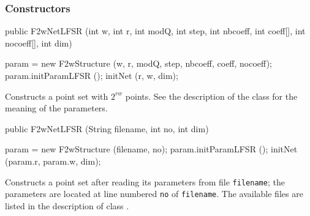 \subsubsection*{Constructors}
\begin{code}

   public F2wNetLFSR (int w, int r, int modQ, int step, int nbcoeff,
                      int coeff[], int nocoeff[], int dim) \begin{hide} 
   {
      param = new F2wStructure (w, r, modQ, step, nbcoeff, coeff, nocoeff);
      param.initParamLFSR ();
      initNet (r, w, dim);
   }
\end{hide}
\end{code}
 \begin{tabb}
 Constructs a point set with $2^{rw}$ points.  See the description of the class
for the meaning of the parameters.
 \end{tabb}
\begin{code}

   public F2wNetLFSR (String filename, int no, int dim) \begin{hide} 
   {
      param = new F2wStructure (filename, no);
      param.initParamLFSR ();
      initNet (param.r, param.w, dim);
   }\end{hide}
\end{code}
 \begin{tabb}
 Constructs a point set after reading its parameters from
   file \texttt{filename}; the parameters are located at line numbered \texttt{no}
   of \texttt{filename}. The available files are listed in the description of class
.
 \end{tabb}
\begin{code}
\begin{hide}

   public String toString ()
   {
       String s = "F2wNetLFSR:" + PrintfFormat.NEWLINE;
       return s + param.toString ();
   }


   private void initNet (int r, int w, int dim)
   {
      numCols = r * w;
      numRows = 31;
      outDigits = 31;
      numPoints = (1 << numCols);
      this.dim = dim;
      normFactor = 1.0 / (1L << 31);
      genMat = new int[dim * numCols];

      for (int j = 0; j < numCols; j++) {
         param.state = 1 << (r * w - 1 - j);
         param.initF2wLFSR ();
         genMat[j] = param.output;
         for (int i = 1; i < dim; i++) {
            param.F2wLFSR ();
            genMat[i * numCols + j] = param.output;
         }
      }
   }
}
\end{hide}
\end{code}
